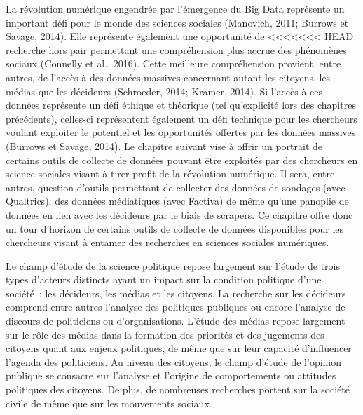 \documentclass[
  letterpaper,
]{scrbook}
\begin{document}
La révolution numérique engendrée par l'émergence du Big Data représente
un important défi pour le monde des sciences sociales (Manovich, 2011;
Burrows et Savage, 2014). Elle représente également une opportunité de
<<<<<<< HEAD
recherche hors pair permettant une compréhension plus accrue des
phénomènes sociaux (Connelly et al., 2016). Cette meilleure
compréhension provient, entre autres, de l'accès à des données massives
concernant autant les citoyens, les médias que les décideurs (Schroeder,
2014; Kramer, 2014). Si l'accès à ces données représente un défi éthique
et théorique (tel qu'explicité lors des chapitres précédents), celles-ci
représentent également un défi technique pour les chercheurs voulant
exploiter le potentiel et les opportunités offertes par les données
massives (Burrows et Savage, 2014). Le chapitre suivant vise à offrir un
portrait de certains outils de collecte de données pouvant être
exploités par des chercheurs en science sociales visant à tirer profit
de la révolution numérique. Il sera, entre autres, question d'outils
permettant de collecter des données de sondages (avec Qualtrics), des
données médiatiques (avec Factiva) de même qu'une panoplie de données en
lien avec les décideurs par le biais de scrapers. Ce chapitre offre donc
un tour d'horizon de certains outils de collecte de données disponibles
pour les chercheurs visant à entamer des recherches en sciences sociales
numériques.

Le champ d'étude de la science politique repose largement sur l'étude de
trois types d'acteurs distincts ayant un impact sur la condition
politique d'une société~: les décideurs, les médias et les citoyens. La
recherche sur les décideurs comprend entre autres l'analyse des
politiques publiques ou encore l'analyse de discours de politiciens ou
d'organisations. L'étude des médias repose largement sur le rôle des
médias dans la formation des priorités et des jugements des citoyens
quant aux enjeux politiques, de même que sur leur capacité d'influencer
l'agenda des politiciens. Au niveau des citoyens, le champ d'étude de
l'opinion publique se consacre sur l'analyse et l'origine de
comportements ou attitudes politiques des citoyens. De plus, de
nombreuses recherches portent sur la société civile de même que sur les
mouvements sociaux.
\end{document}
